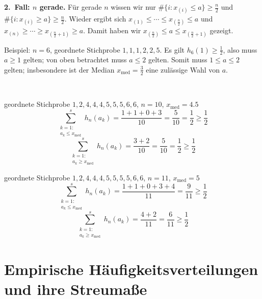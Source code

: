 \begin{satz}
\begin{enumerate}[label=(\alph*)]
        \textbf{2.\ Fall: $n$ gerade.} Für gerade $n$ wissen wir nur $\#\{i: x_{(i)}\leq a\}\geq\frac n2$ und $\#\{i: x_{(i)}\geq a\}\geq\frac n2$.
        Wieder ergibt sich $x_{(1)}\leq\cdots\leq x_{\left(\frac n2\right)}\leq a$ und $x_{(n)}\geq\cdots\geq x_{\left(\frac n2+1\right)}\geq a$.
        Damit haben wir $x_{\left(\frac n2\right)}\leq a\leq x_{\left(\frac n2+1\right)}$ gezeigt.

        Beispiel: $n=6$, geordnete Stichprobe $1,1,1,2,2,5$.
        Es gilt $h_6(1)\geq\frac12$, also muss $a\geq1$ gelten; von oben betrachtet muss $a\leq2$ gelten.
        Somit muss $1\leq a\leq2$ gelten; insbesondere ist der Median $x_{\mathrm{med}}=\frac32$ eine zulässige Wahl von $a$. \qedhere
    \end{enumerate}
\end{satz}

\begin{bsp}[Würfeln]  \\
    \begin{mytable}
        \begin{minipage}{0.48\textwidth}
            geordnete Stichprobe $1,2,4,4,4,5,5,5,6,6$, $n=10$, $x_{\mathrm{med}}=4.5$
            \[
                \sum_{\substack{k=1:\\ a_k\leq x_{\mathrm{med}}}}^s h_n(a_k) = \frac{1+1+0+3}{10}=\frac{5}{10}=\frac12\geq\frac12
            \]
            \[
                \sum_{\substack{k=1:\\ a_k\geq x_{\mathrm{med}}}}^s h_n(a_k) = \frac{3+2}{10}=\frac{5}{10}=\frac12\geq\frac12
            \]
        \end{minipage}
        \hfill
        \begin{minipage}{0.48\textwidth}
            geordnete Stichprobe $1,2,4,4,4,5,5,5,5,6,6$, $n=11$, $x_{\mathrm{med}}=5$
            \[
                \sum_{\substack{k=1:\\ a_k\leq x_{\mathrm{med}}}}^s h_n(a_k) = \frac{1+1+0+3+4}{11}=\frac{9}{11}\geq\frac12
            \]
            \[
                \sum_{\substack{k=1:\\ a_k\geq x_{\mathrm{med}}}}^s h_n(a_k) = \frac{4+2}{11}=\frac{6}{11}\geq\frac12
            \]
        \end{minipage}
    \end{mytable}
\end{bsp}

\section{Empirische Häufigkeitsverteilungen und ihre \gls{Streumaß}e}\label{sec:empirische-haufigkeitsverteilungen-und-ihre-streumae}

